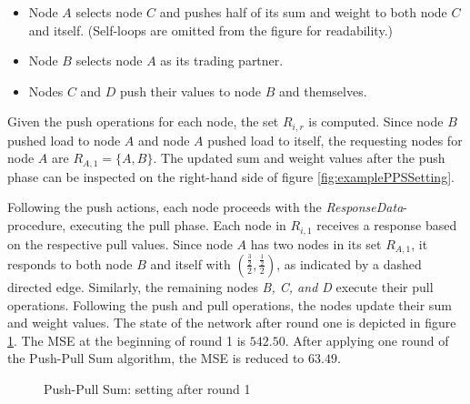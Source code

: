 \begin{itemize}
    \item Node $A$ selects node $C$ and pushes half of its sum and weight to both node $C$ and itself. (Self-loops are omitted from the figure for readability.)
    \item Node $B$ selects node $A$ as its trading partner.
    \item Nodes $C$ and $D$ push their values to node $B$ and themselves.
\end{itemize}

Given the push operations for each node, the set $R_{i,r}$ is computed. Since node $B$ pushed load to node $A$ and node $A$ pushed load to itself, the requesting nodes for node $A$ are $R_{A,1}=\{A,B\}$. The updated sum and weight values after the push phase can be inspected on the right-hand side of figure \ref{fig:examplePPSSetting}.

Following the push actions, each node proceeds with the \textit{ResponseData}-procedure, executing the pull phase. Each node in $R_{i,1}$ receives a response based on the respective pull values. Since node $A$ has two nodes in its set $R_{A,1}$, it responds to both node $B$ and itself with $\left(\frac{\frac{3}{2}}{2}, \frac{\frac{1}{2}}{2}\right)$, as indicated by a dashed directed edge. Similarly, the remaining nodes \textit{B, C, and D} execute their pull operations. Following the push and pull operations, the nodes update their sum and weight values. The state of the network after round one is depicted in figure \ref{fig:examplePPSResult}. The MSE at the beginning of round 1 is $542.50$. After applying one round of the Push-Pull Sum algorithm, the MSE is reduced to $63.49$.

\begin{figure}
    \centering
    \scalebox{0.75}{}
    \caption{Push-Pull Sum: setting after round 1}
    \label{fig:examplePPSResult}
\end{figure}

